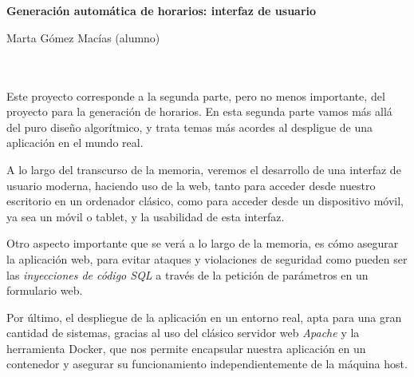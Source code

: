 \chapter*{}
\thispagestyle{empty}
\cleardoublepage

\thispagestyle{empty}

% 



\cleardoublepage
\thispagestyle{empty}

\begin{center}
{\large\bfseries Generación automática de horarios: interfaz de usuario}\\
\end{center}
\begin{center}
Marta Gómez Macías (alumno)\\
\end{center}

\\

\vspace{0.7cm}
\\

Este proyecto corresponde a la segunda parte, pero no menos importante, del proyecto para la generación de horarios. En esta segunda parte vamos más allá del puro diseño algorítmico, y trata temas más acordes al despligue de una aplicación en el mundo real.

A lo largo del transcurso de la memoria, veremos el desarrollo de una interfaz de usuario moderna, haciendo uso de la web, tanto para acceder desde nuestro escritorio en un ordenador clásico, como para acceder desde un dispositivo móvil, ya sea un móvil o tablet, y la usabilidad de esta interfaz.

Otro aspecto importante que se verá a lo largo de la memoria, es cómo asegurar la aplicación web, para evitar ataques y violaciones de seguridad como pueden ser las \textit{inyecciones de código SQL} a través de la petición de parámetros en un formulario web.

Por último, el despliegue de la aplicación en un entorno real, apta para una gran cantidad de sistemas, gracias al uso del clásico servidor web \textit{Apache} y la herramienta Docker, que nos permite encapsular nuestra aplicación en un contenedor y asegurar su funcionamiento independientemente de la máquina host.
\cleardoublepage


